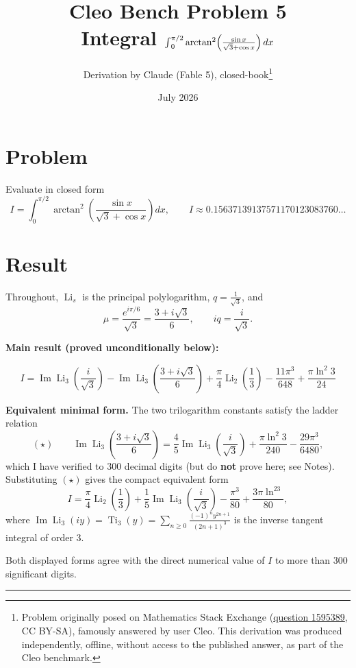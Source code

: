 \documentclass[11pt]{article}
\title{Cleo Bench Problem 5\\[1ex]\large Integral ${\large\int}_0^{\pi/2}\arctan^2\!\left(\frac{\sin x}{\sqrt3+\cos x}\right)dx$}
\author{Derivation by Claude (Fable 5), closed-book\thanks{Problem originally
posed on Mathematics Stack Exchange
(\href{https://math.stackexchange.com/q/1595389}{question 1595389}, CC BY-SA),
famously answered by user Cleo. This derivation was produced independently,
offline, without access to the published answer, as part of the Cleo benchmark.}}
\date{July 2026}
\theoremstyle{remark}
\begin{document}
\maketitle

\section*{Problem}

Evaluate in closed form
\[
I=\int_0^{\pi/2}\arctan^2\!\left(\frac{\sin x}{\sqrt3+\cos x}\right)dx,
\qquad I\approx 0.15637139137571170123083760\ldots
\]

\section*{Result}

Throughout, $\operatorname{Li}_s$ is the principal polylogarithm, $q=\tfrac1{\sqrt3}$, and
\[
\mu=\frac{e^{i\pi/6}}{\sqrt3}=\frac{3+i\sqrt3}{6},\qquad iq=\frac{i}{\sqrt3}.
\]

\textbf{Main result (proved unconditionally below):}

\[
\boxed{\;I=\operatorname{Im}\operatorname{Li}_3\!\left(\frac{i}{\sqrt3}\right)
-\operatorname{Im}\operatorname{Li}_3\!\left(\frac{3+i\sqrt3}{6}\right)
+\frac{\pi}{4}\operatorname{Li}_2\!\left(\frac13\right)
-\frac{11\pi^3}{648}+\frac{\pi\ln^2 3}{24}\;}
\]

\textbf{Equivalent minimal form.} The two trilogarithm constants satisfy the ladder relation
\[
(\star)\qquad
\operatorname{Im}\operatorname{Li}_3\!\left(\frac{3+i\sqrt3}{6}\right)
=\frac45\operatorname{Im}\operatorname{Li}_3\!\left(\frac{i}{\sqrt3}\right)
+\frac{\pi\ln^2 3}{240}-\frac{29\pi^3}{6480},
\]
which I have verified to $300$ decimal digits (but do \textbf{not} prove here; see Notes).
Substituting $(\star)$ gives the compact equivalent form
\[
I=\frac{\pi}{4}\operatorname{Li}_2\!\left(\frac13\right)
+\frac15\operatorname{Im}\operatorname{Li}_3\!\left(\frac{i}{\sqrt3}\right)
-\frac{\pi^3}{80}+\frac{3\pi\ln^23}{80},
\]
where $\operatorname{Im}\operatorname{Li}_3(iy)=\operatorname{Ti}_3(y)=\sum_{n\ge0}\frac{(-1)^ny^{2n+1}}{(2n+1)^3}$ is the inverse tangent integral of order 3.

Both displayed forms agree with the direct numerical value of $I$ to more than $300$ significant digits.

\begin{center}\rule{0.5\linewidth}{0.4pt}\end{center}
\end{document}

